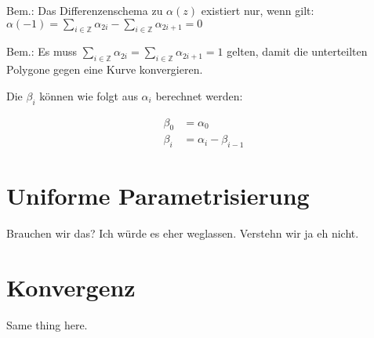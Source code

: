 \documentclass[8pt, DIV15, twocolumn]{scrartcl}
\begin{document}
Bem.: Das Differenzenschema zu $\alpha\left(z\right)$ existiert nur, wenn gilt:
$\alpha\left(-1\right) = \sum\limits_{i\in\mathbb{Z}} \alpha_{2i} - \sum\limits_{i\in\mathbb{Z}} \alpha_{2i + 1} = 0$

Bem.: Es muss $\sum\limits_{i\in\mathbb{Z}} \alpha_{2i} = \sum\limits_{i\in\mathbb{Z}} \alpha_{2i+1} = 1$ gelten, damit die unterteilten Polygone gegen eine Kurve konvergieren.

Die $\beta_i$ können wie folgt aus $\alpha_i$ berechnet werden:

\begin{equation*}
\begin{aligned}
\beta_0 &= \alpha_0 \\
\beta_i &= \alpha_i - \beta_{i-1}
\end{aligned}
\end{equation*}

\section*{Uniforme Parametrisierung}
Brauchen wir das? Ich würde es eher weglassen. Verstehn wir ja eh nicht.
\section*{Konvergenz}
Same thing here.
\end{document}

